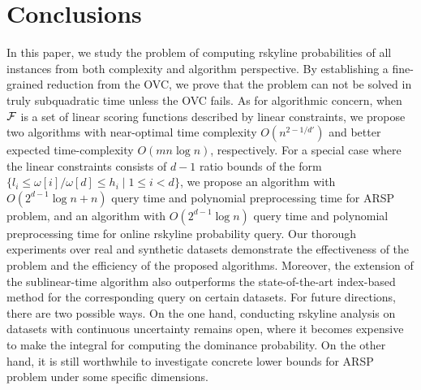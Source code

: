 \section{Conclusions}\label{sec:conclusions}

In this paper, we study the problem of computing rskyline probabilities of all instances from both complexity and algorithm perspective.
By establishing a fine-grained reduction from the OVC, we prove that the problem can not be solved in truly subquadratic time unless the OVC fails.
As for algorithmic concern, when $\mathcal{F}$ is a set of linear scoring functions described by linear constraints, we propose two algorithms with near-optimal time complexity $O(n^{2 - 1/d'})$ and better expected time-complexity $O(mn\log{n})$, respectively.
For a special case where the linear constraints consists of $d - 1$ ratio bounds of the form $\{l_i \le \omega[i]/\omega[d] \le h_i \mid 1 \le i < d \}$, we propose an algorithm with $O(2^{d-1}\log{n} + n)$ query time and polynomial preprocessing time for ARSP problem, and an algorithm with $O(2^{d-1}\log{n})$ query time and polynomial preprocessing time for online rskyline probability query.
Our thorough experiments over real and synthetic datasets demonstrate the effectiveness of the problem and the efficiency of the proposed algorithms.
Moreover, the extension of the sublinear-time algorithm also outperforms the state-of-the-art index-based method for the corresponding query on certain datasets.
For future directions, there are two possible ways.
On the one hand, conducting rskyline analysis on datasets with continuous uncertainty remains open, where it becomes expensive to make the integral for computing the dominance probability.
On the other hand, it is still worthwhile to investigate concrete lower bounds for ARSP problem under some specific dimensions.